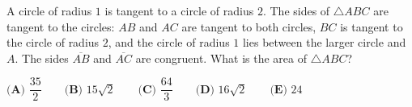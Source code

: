 A circle of radius $1$ is tangent to a circle of radius $2$. The sides of $\triangle ABC$ are tangent to the circles: $AB$ and $AC$ are tangent to both circles, $BC$ is tangent to the circle of radius $2$, and the circle of radius $1$ lies between the larger circle and $A$. The sides $\overline{AB}$ and $\overline{AC}$ are congruent. What is the area of $\triangle ABC$?

$\textbf{(A) }\dfrac{35}{2}\qquad\textbf{(B) }15\sqrt2\qquad\textbf{(C) }\dfrac{64}{3}\qquad\textbf{(D) }16\sqrt2\qquad\textbf{(E) }24$
